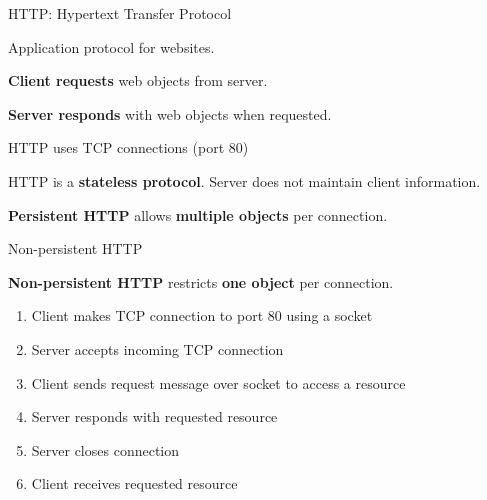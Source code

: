 \begin{topic}{HTTP: Hypertext Transfer Protocol}

Application protocol for websites.

\textbf{Client requests} web objects from server.

\textbf{Server responds} with web objects when requested.

HTTP uses TCP connections (port 80)

HTTP is a \textbf{stateless protocol}. Server does not maintain client information.

\textbf{Persistent HTTP} allows \textbf{multiple objects} per connection. 


\end{topic}

\begin{topic}{Non-persistent HTTP}

\textbf{Non-persistent HTTP} restricts \textbf{one object} per connection.

\begin{enumerate}
	\item Client makes TCP connection to port 80 using a socket
	\item Server accepts incoming TCP connection
	\item Client sends request message over socket to access a resource
	\item Server responds with requested resource
	\item Server closes connection
	\item Client receives requested resource
\end{enumerate}

\end{topic}

